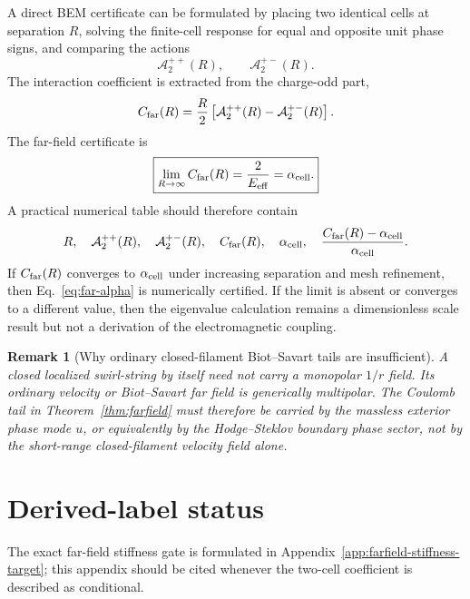 \documentclass[11pt]{article}
\newcommand{\Eeff}{E_{\rm eff}}
\newcommand{\alphacell}{\alpha_{\rm cell}}
\newcommand{\Cfar}{C_{\rm far}}
\newcommand{\Atwo}{\mathcal A_{2}}
\newtheorem{remark}{Remark}
\begin{document}
A direct BEM certificate can be formulated by placing two identical cells at separation \(R\), solving the finite-cell response for equal and opposite unit phase signs, and comparing the actions
\begin{equation}
\Atwo^{++}(R),
\qquad
\Atwo^{+-}(R).
\end{equation}
The interaction coefficient is extracted from the charge-odd part,
\begin{equation}
\Cfar(R)
=
\frac{R}{2}\left[\Atwo^{++}(R)-\Atwo^{+-}(R)\right].
\label{eq:CfarR}
\end{equation}
The far-field certificate is
\begin{equation}
\boxed{
\lim_{R\to\infty}\Cfar(R)=\frac{2}{\Eeff}=\alphacell.
}
\label{eq:certificate}
\end{equation}
A practical numerical table should therefore contain
\begin{equation}
R,
\quad
\Atwo^{++}(R),
\quad
\Atwo^{+-}(R),
\quad
\Cfar(R),
\quad
\alphacell,
\quad
\frac{\Cfar(R)-\alphacell}{\alphacell}.
\end{equation}
If \(\Cfar(R)\) converges to \(\alphacell\) under increasing separation and mesh refinement, then Eq.~\eqref{eq:far-alpha} is numerically certified. If the limit is absent or converges to a different value, then the eigenvalue calculation remains a dimensionless scale result but not a derivation of the electromagnetic coupling.

\begin{remark}[Why ordinary closed-filament Biot--Savart tails are insufficient]
A closed localized swirl-string by itself need not carry a monopolar \(1/r\) field. Its ordinary velocity or Biot--Savart far field is generically multipolar. The Coulomb tail in Theorem~\ref{thm:farfield} must therefore be carried by the massless exterior phase mode \(u\), or equivalently by the Hodge--Steklov boundary phase sector, not by the short-range closed-filament velocity field alone.
\end{remark}


\section{Derived-label status}

The exact far-field stiffness gate is formulated in Appendix~\ref{app:farfield-stiffness-target}; this appendix should be cited whenever the two-cell coefficient is described as conditional.


\label{sec:derived-label-status}
\end{document}
